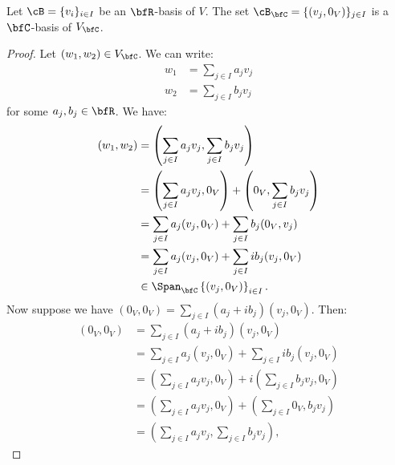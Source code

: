     \begin{proposition}
        Let $\cB = \{v_i\}_{i \in I}$ be an $\bfR$-basis of $V$. The set $\cB_\bfC = \{(v_j,0_V)\}_{j \in I}$ is a $\bfC$-basis of $V_\bfC$.
    \end{proposition}
        \begin{proof}
            Let $(w_1,w_2) \in V_\bfC$. We can write:
                \begin{equation*}
                \begin{split}
                    w_1 &= \sum_{j \in I}a_j v_j \\
                    w_2 &= \sum_{j \in I}b_j v_j
                \end{split}
                \end{equation*}
            for some $a_j,b_j \in \bfR$. We have:
                \begin{equation*}
                \begin{split}
                     (w_1,w_2)
                     & = \left(\sum_{j \in I}a_jv_j, \sum_{j \in I}b_j v_j\right) \\
                     & = \left(\sum_{j \in I}a_jv_j, 0_V\right) + \left( 0_V, \sum_{j \in I}b_j v_j\right) \\
                     & = \sum_{j \in I}a_j(v_j,0_V) + \sum_{j \in I}b_j(0_V,v_j) \\
                     & = \sum_{j \in I}a_j(v_j,0_V) + \sum_{j \in I}ib_j(v_j,0_V) \\
                     &\in \Span_\bfC \left\{(v_j,0_V)\right\}_{i \in I}.
                \end{split}
                \end{equation*}
            Now suppose we have $(0_V,0_V) = \sum_{j \in I}(a_j + ib_j)(v_j,0_V)$. Then:
                \begin{equation*}
                \begin{split}
                    (0_V,0_V) 
                    &= \sum_{j \in I}(a_j + ib_j)(v_j,0_V) \\
                    & = \sum_{j \in I}a_j(v_j,0_V) + \sum_{j \in I}ib_j(v_j,0_V) \\
                    & = \left(\sum_{j \in I}a_jv_j, 0_V\right) + i \left(\sum_{j \in I}b_jv_j,0_V\right) \\
                    & = \left(\sum_{j \in I}a_jv_j, 0_V\right) + \left(\sum_{j \in I}0_V,b_jv_j\right) \\
                    & = \left(\sum_{j \in I}a_jv_j, \sum_{j \in I}b_jv_j\right),

\end{split}
\end{equation*}
\end{proof}
